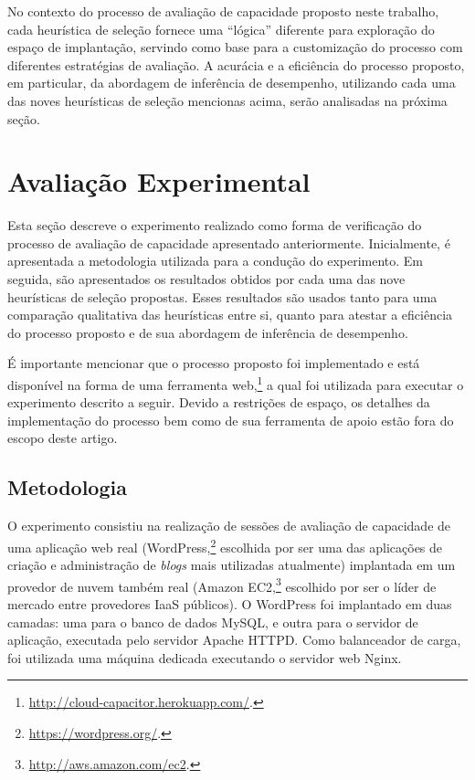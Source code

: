 \documentclass[12pt]{article}
\begin{document}
 
No contexto do processo de avaliação de capacidade proposto neste trabalho, cada heurística de seleção fornece uma ``lógica'' diferente para exploração do espaço de implantação, servindo como base para a customização do processo com diferentes estratégias de avaliação. A acurácia e a eficiência do processo proposto, em particular, da abordagem de inferência de desempenho, utilizando cada uma das noves heurísticas de seleção mencionas acima, serão analisadas na próxima seção. 



\section{Avaliação Experimental}\label{sec:experiments}

Esta seção descreve o experimento realizado como forma de verificação do processo de avaliação de capacidade apresentado anteriormente. Inicialmente, é apresentada a metodologia utilizada para a condução do experimento. Em seguida, são apresentados os resultados obtidos por cada uma das nove heurísticas de seleção propostas. Esses resultados são usados tanto para uma comparação qualitativa das heurísticas entre si, quanto para atestar
a eficiência do processo proposto e de sua abordagem de inferência de desempenho. 

É importante mencionar que o processo proposto foi implementado e está disponível na forma de uma ferramenta web,\footnote{\scriptsize \url{http://cloud-capacitor.herokuapp.com/}.} a qual foi utilizada para executar o experimento descrito a seguir. Devido a restrições de espaço, os detalhes da implementação do processo bem como de sua ferramenta de apoio estão fora do escopo deste artigo.

\subsection{Metodologia}

O experimento consistiu na realização de sessões de avaliação de
capacidade de uma aplicação web real (WordPress,\footnote{\scriptsize \url{https://wordpress.org/}.} escolhida por ser uma das aplicações de criação e administração de \emph{blogs} mais utilizadas atualmente) implantada em um provedor de nuvem também real (Amazon EC2,\footnote{\scriptsize \url{http://aws.amazon.com/ec2}.} escolhido por ser o líder de mercado entre provedores IaaS públicos). O WordPress foi implantado em duas camadas: uma para o banco de  dados MySQL, e outra para o servidor de aplicação, executada pelo servidor Apache HTTPD. Como balanceador de carga, foi utilizada uma máquina dedicada executando o servidor web Nginx. 
\end{document}
